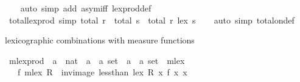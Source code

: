 \begin{isabellebody}
%
\isadelimproof
\ \ %
\endisadelimproof
%
\isatagproof
{}\isamarkupfalse%
\ {\isacharparenleft}{\kern0pt}auto\ simp\ add{\isacharcolon}{\kern0pt}\ asym{\isacharunderscore}{\kern0pt}iff\ lex{\isacharunderscore}{\kern0pt}prod{\isacharunderscore}{\kern0pt}def{\isacharparenright}{\kern0pt}%
\endisatagproof
{\isafoldproof}%
%
\isadelimproof
\isanewline
%
\endisadelimproof
\isanewline
{}\isamarkupfalse%
\ total{\isacharunderscore}{\kern0pt}lex{\isacharunderscore}{\kern0pt}prod\ {\isacharbrackleft}{\kern0pt}simp{\isacharbrackright}{\kern0pt}{\isacharcolon}{\kern0pt}\ {\isachardoublequoteopen}total\ r\ {\isasymLongrightarrow}\ total\ s\ {\isasymLongrightarrow}\ total\ {\isacharparenleft}{\kern0pt}r\ {\isacharless}{\kern0pt}{\isacharasterisk}{\kern0pt}lex{\isacharasterisk}{\kern0pt}{\isachargreater}{\kern0pt}\ s{\isacharparenright}{\kern0pt}{\isachardoublequoteclose}\isanewline
%
\isadelimproof
\ \ %
\endisadelimproof
%
\isatagproof
{}\isamarkupfalse%
\ {\isacharparenleft}{\kern0pt}auto\ simp{\isacharcolon}{\kern0pt}\ total{\isacharunderscore}{\kern0pt}on{\isacharunderscore}{\kern0pt}def{\isacharparenright}{\kern0pt}%
\endisatagproof
{\isafoldproof}%
%
\isadelimproof
%
\endisadelimproof
%
\begin{isamarkuptext}%
lexicographic combinations with measure functions%
\end{isamarkuptext}\isamarkuptrue%
\isamarkupfalse%
\ mlex{\isacharunderscore}{\kern0pt}prod\ {\isacharcolon}{\kern0pt}{\isacharcolon}{\kern0pt}\ {\isachardoublequoteopen}{\isacharparenleft}{\kern0pt}{\isacharprime}{\kern0pt}a\ {\isasymRightarrow}\ nat{\isacharparenright}{\kern0pt}\ {\isasymRightarrow}\ {\isacharparenleft}{\kern0pt}{\isacharprime}{\kern0pt}a\ {\isasymtimes}\ {\isacharprime}{\kern0pt}a{\isacharparenright}{\kern0pt}\ set\ {\isasymRightarrow}\ {\isacharparenleft}{\kern0pt}{\isacharprime}{\kern0pt}a\ {\isasymtimes}\ {\isacharprime}{\kern0pt}a{\isacharparenright}{\kern0pt}\ set{\isachardoublequoteclose}\ {\isacharparenleft}{\kern0pt}\ {\isachardoublequoteopen}{\isacharless}{\kern0pt}{\isacharasterisk}{\kern0pt}mlex{\isacharasterisk}{\kern0pt}{\isachargreater}{\kern0pt}{\isachardoublequoteclose}\ {}{}{\isacharparenright}{\kern0pt}\isanewline
\ \ \ {\isachardoublequoteopen}f\ {\isacharless}{\kern0pt}{\isacharasterisk}{\kern0pt}mlex{\isacharasterisk}{\kern0pt}{\isachargreater}{\kern0pt}\ R\ {\isacharequal}{\kern0pt}\ inv{\isacharunderscore}{\kern0pt}image\ {\isacharparenleft}{\kern0pt}less{\isacharunderscore}{\kern0pt}than\ {\isacharless}{\kern0pt}{\isacharasterisk}{\kern0pt}lex{\isacharasterisk}{\kern0pt}{\isachargreater}{\kern0pt}\ R{\isacharparenright}{\kern0pt}\ {\isacharparenleft}{\kern0pt}{\isasymlambda}x{\isachardot}{\kern0pt}\ {\isacharparenleft}{\kern0pt}f\ x{\isacharcomma}{\kern0pt}\ x{\isacharparenright}{\kern0pt}{\isacharparenright}{\kern0pt}{\isachardoublequoteclose}\isanewline

\end{isabellebody}
